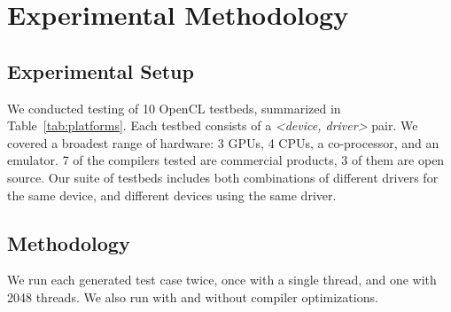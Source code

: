 \section{Experimental Methodology}

\subsection{Experimental Setup}

\begin{table*}[t!]
  \scriptsize %
  \centering %
  
  \caption{%
    OpenCL testbeds, the time spent in automated testing, and the number of bug reports submitted to date. %
  }
  \label{tab:platforms}
\end{table*}

We conducted testing of 10 OpenCL testbeds, summarized in Table~\ref{tab:platforms}. Each testbed consists of a \emph{<device, driver>} pair. We covered a broadest range of hardware: 3 GPUs, 4 CPUs, a co-processor, and an emulator. 7 of the compilers tested are commercial products, 3 of them are open source. Our suite of testbeds includes both combinations of different drivers for the same device, and different devices using the same driver.

\subsection{Methodology}

We run each generated test case twice, once with a single thread, and one with 2048 threads. We also run with and without compiler optimizations.